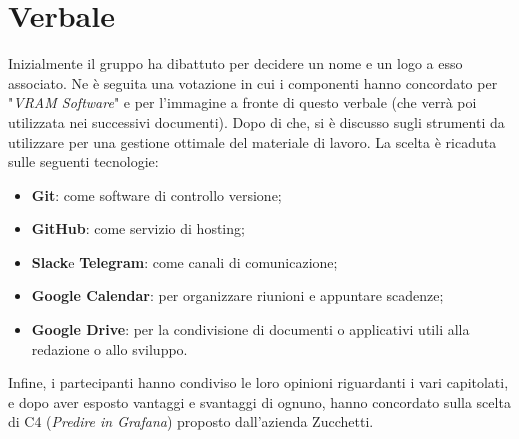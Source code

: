 \section{Verbale}
    Inizialmente il gruppo ha dibattuto per decidere un nome e un logo a esso associato. Ne è seguita una votazione in cui i componenti hanno
    concordato per "\textit{VRAM Software}" e per l'immagine a fronte di questo verbale (che verrà poi utilizzata nei successivi documenti). Dopo di che, si è discusso
    sugli strumenti da utilizzare per una gestione ottimale del materiale di lavoro. La scelta è ricaduta sulle seguenti tecnologie:
    \begin{itemize}
        \item \textbf{Git}\glo: come software di controllo versione;
        \item \textbf{GitHub}\glo: come servizio di hosting;
        \item \textbf{Slack}\glo e \textbf{Telegram}\glo: come canali di comunicazione;
        \item \textbf{Google Calendar}\glo: per organizzare riunioni e appuntare scadenze;
        \item \textbf{Google Drive}\glo: per la condivisione di documenti o applicativi utili alla redazione o allo sviluppo.
    \end{itemize}
    Infine, i partecipanti hanno condiviso le loro opinioni riguardanti i vari capitolati\glo, e dopo aver esposto vantaggi e svantaggi di ognuno, hanno concordato sulla
    scelta di C4 (\textit{Predire in Grafana}) proposto dall'azienda Zucchetti.